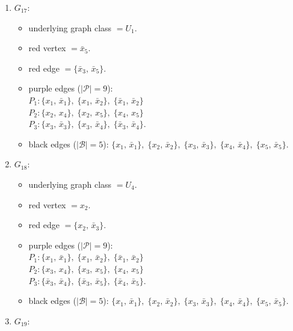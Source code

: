 \begin{enumerate}[leftmargin=*]
\begin{itemize}[leftmargin=*]
\item black edges ($|\mathcal{B}|=5$): $\{x_{1},\,\bar{x}_{1}\},\; \{x_{2},\,\bar{x}_{2}\},\; \{x_{3},\,\bar{x}_{3}\},\; \{x_{4},\,\bar{x}_{4}\},\; \{x_{5},\,\bar{x}_{5}\}$.
\end{itemize}
\item $G_{17}$:
\begin{itemize}[leftmargin=*]
\item underlying graph class $= U_1$.
\item red vertex $= \bar{x}_{5}$.
\item red edge $= \{\bar{x}_{3},\,\bar{x}_{5}\}$.
\item purple edges ($|\mathcal{P}|=9$):\mbox{}\\
$P_{1}: \{x_{1},\,\bar{x}_{1}\},\; \{x_{1},\,\bar{x}_{2}\},\; \{\bar{x}_{1},\,\bar{x}_{2}\}$\\
$P_{2}: \{x_{2},\,x_{4}\},\; \{x_{2},\,x_{5}\},\; \{x_{4},\,x_{5}\}$\\
$P_{3}: \{x_{3},\,\bar{x}_{3}\},\; \{x_{3},\,\bar{x}_{4}\},\; \{\bar{x}_{3},\,\bar{x}_{4}\}$.
\item black edges ($|\mathcal{B}|=5$): $\{x_{1},\,\bar{x}_{1}\},\; \{x_{2},\,\bar{x}_{2}\},\; \{x_{3},\,\bar{x}_{3}\},\; \{x_{4},\,\bar{x}_{4}\},\; \{x_{5},\,\bar{x}_{5}\}$.
\end{itemize}
\item $G_{18}$:
\begin{itemize}[leftmargin=*]
\item underlying graph class $= U_4$.
\item red vertex $= x_{2}$.
\item red edge $= \{x_{2},\,\bar{x}_{3}\}$.
\item purple edges ($|\mathcal{P}|=9$):\mbox{}\\
$P_{1}: \{x_{1},\,\bar{x}_{1}\},\; \{x_{1},\,\bar{x}_{2}\},\; \{\bar{x}_{1},\,\bar{x}_{2}\}$\\
$P_{2}: \{x_{3},\,x_{4}\},\; \{x_{3},\,x_{5}\},\; \{x_{4},\,x_{5}\}$\\
$P_{3}: \{\bar{x}_{3},\,\bar{x}_{4}\},\; \{\bar{x}_{3},\,\bar{x}_{5}\},\; \{\bar{x}_{4},\,\bar{x}_{5}\}$.
\item black edges ($|\mathcal{B}|=5$): $\{x_{1},\,\bar{x}_{1}\},\; \{x_{2},\,\bar{x}_{2}\},\; \{x_{3},\,\bar{x}_{3}\},\; \{x_{4},\,\bar{x}_{4}\},\; \{x_{5},\,\bar{x}_{5}\}$.
\end{itemize}
\item $G_{19}$:
\begin{itemize}[leftmargin=*]

\end{itemize}
\end{enumerate}
